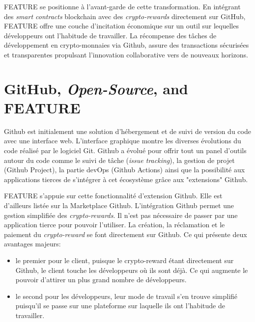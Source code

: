 \documentclass[
	a4paper, %
	10pt, %
	unnumberedsections, %
	twoside, %
]{LTJournalArticle}
\begin{document}
FEATURE se positionne à l'avant-garde de cette transformation. En intégrant des \emph{smart contracts} blockchain avec des \emph{crypto-rewards} directement sur GitHub, FEATURE offre une couche d'incitation économique sur un outil sur lequelles développeurs ont l'habitude de travailler. La récompense des tâches de développement en crypto-monnaies via Github, assure des transactions sécurisées et transparentes propulsant l'innovation collaborative vers de nouveaux horizons.


\section{GitHub, \emph{Open-Source}, and FEATURE}

Github est initialement une solution d'hébergement et de suivi de version du code avec une interface web. L'interface graphique montre les diverses évolutions du code réalisé par le logiciel Git. Github a évolué pour offrir tout un panel d'outils autour du code comme le suivi de tâche (\emph{issue tracking}), la gestion de projet (Github Project), la partie devOps (Github Actions) ainsi que la possibilité aux applications tierces de s'intégrer à cet écosystème grâce aux "extensions" Github.

FEATURE s'appuie sur cette fonctionnalité d'extension Github. Elle est d'ailleurs listée sur la Marketplace Github. L'intégration Github permet une gestion simplifiée des \emph{crypto-rewards}. Il n'est pas nécessaire de passer par une application tierce pour pouvoir l'utiliser. La création, la réclamation et le paiement du \emph{crypto-reward} se font directement sur Github. Ce qui présente deux avantages majeurs:
\begin{itemize}
\item
  le premier pour le client, puisque le crypto-reward étant directement sur Github, le client touche les développeurs où ils sont déjà. Ce qui augmente le pouvoir d'attirer un plus grand nombre de développeurs.
\item
  le second pour les développeurs, leur mode de travail s'en trouve simplifié puisqu'il se passe sur une plateforme sur laquelle ils ont l'habitude de travailler.
\end{itemize}
\end{document}
